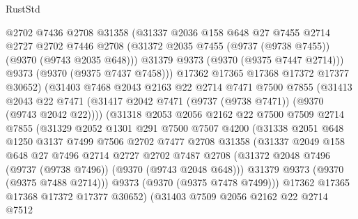 \begin{lexlean}{RustStd}
\begin{coremodule}
{\begin{coremodule}
{{{{{{{{{{{{{{{{{{{{{{{{{{{{{{{{{{{{{{{                @2702
                @7436
                @2708
                @31358
                (@31337
                  @2036
                  @158
                  @648
                  @27
                  @7455
                  @2714
                  @2727
                  @2702
                  @7446
                  @2708
                  (@31372 @2035 @7455 (@9737 (@9738 @7455)) (@9370 (@9743 @2035 @648)))
                  @31379
                  @9373
                  (@9370 (@9375 @7447 @2714)))
                @9373
                (@9370 (@9375 @7437 @7458)))
              @17362
              @17365
              @17368
              @17372
              @17377
              @30652)
            (@31403
              @7468
              @2043
              @2163
              @22
              @2714
              @7471
              @7500
              @7855
              (@31413
                @2043
                @22
                @7471
                (@31417 @2042 @7471 (@9737 (@9738 @7471)) (@9370 (@9743 @2042 @22))))
              (@31318
                @2053
                @2056
                @2162
                @22
                @7500
                @7509
                @2714
                @7855
                (@31329
                  @2052
                  @1301
                  @291
                  @7500
                  @7507
                  @4200
                  (@31338
                    @2051
                    @648
                    @1250
                    @3137
                    @7499
                    @7506
                    @2702
                    @7477
                    @2708
                    @31358
                    (@31337
                      @2049
                      @158
                      @648
                      @27
                      @7496
                      @2714
                      @2727
                      @2702
                      @7487
                      @2708
                      (@31372 @2048 @7496 (@9737 (@9738 @7496)) (@9370 (@9743 @2048 @648)))
                      @31379
                      @9373
                      (@9370 (@9375 @7488 @2714)))
                    @9373
                    (@9370 (@9375 @7478 @7499)))
                  @17362
                  @17365
                  @17368
                  @17372
                  @17377
                  @30652)
                (@31403
                  @7509
                  @2056
                  @2162
                  @22
                  @2714
                  @7512
}}}}}}}}}}}}}}}}}}}}}}}}}}}}}}}}}}}}}}}
\end{coremodule}}
\end{coremodule}
\end{lexlean}
